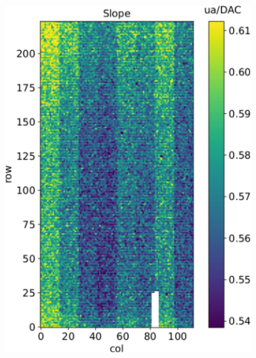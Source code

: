 \begin{figure}
\begin{subfigure}[b]{0.49\textwidth}
            \includegraphics[width=\linewidth]{figures/charaterization/slope_map.pdf}
            \caption{}
            \label{fig:slope_map}
        \end{subfigure}\\
        \begin{subfigure}[b]{0.49\textwidth}
            \centering

\end{subfigure}
\end{figure}

